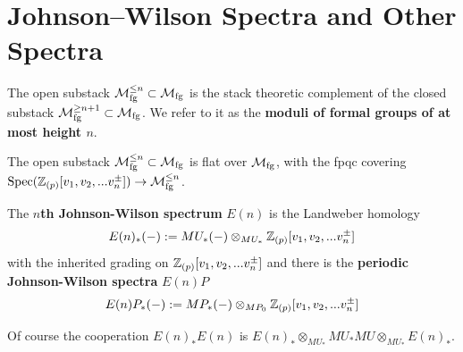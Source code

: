 \section{Johnson--Wilson Spectra and Other Spectra}\label{sec:chromatic-more-johnsonwilson}
\begin{definition}
    The open substack $\mathcal{M}_{\mathrm{fg}}^{\leq n}\subset \mathcal{M}_{\mathrm{fg}}$ is the stack theoretic complement of the closed substack $\mathcal{M}_{\mathrm{fg}}^{\geq n+1}\subset \mathcal{M}_{\mathrm{fg}}$. We refer to it as the \textbf{moduli of formal groups of at most height $n$}.
\end{definition}
The open substack $\mathcal{M}_{\mathrm{fg}}^{\leq n}\subset \mathcal{M}_{\mathrm{fg}}$ is flat over $\mathcal{M}_{\mathrm{fg}}$, with the fpqc covering $\operatorname{\mathrm{Spec}}(\mathbb{Z}_{(p)}[v_1,v_2,...v_{n}^{\pm}])\to \mathcal{M}_{\mathrm{fg}}^{\leq n}$. 
\begin{definition}
    The \textbf{$n$th Johnson-Wilson spectrum} $E(n)$ is the Landweber homology 
    \[
        E(n)_*(-):=MU_*(-)\otimes_{MU_*} \mathbb{Z}_{(p)}[v_1,v_2,...v_{n}^{\pm}]
    \]with the inherited grading on $\mathbb{Z}_{(p)}[v_1,v_2,...v_{n}^{\pm}]$
    and there is the \textbf{periodic Johnson-Wilson spectra} $E(n)P$
    \[
     E(n)P_*(-):=MP_*(-)\otimes_{MP_0} \mathbb{Z}_{(p)}[v_1,v_2,...v_{n}^{\pm}]
    \]
\end{definition}

Of course the cooperation $E(n)_*E(n)$ is $E(n)_*\otimes_{MU_*}MU_*MU\otimes_{MU_*}E(n)_*$.

